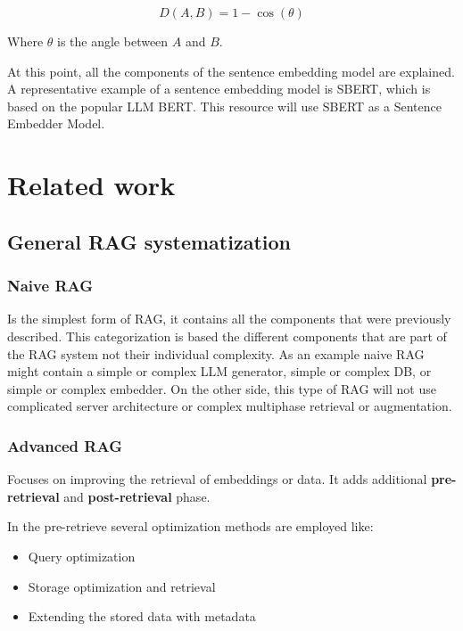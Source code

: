 \documentclass{wseas}
\begin{document}
\begin{equation}
  D(A, B) = 1 - \cos(\theta)
\end{equation}

Where \(\theta\) is the angle between \(A\) and \(B\).

At this point, all the components of the sentence embedding model are
explained. A representative example of a sentence embedding model is
SBERT, which is based on the popular LLM BERT. This resource will use
SBERT as a Sentence Embedder Model.


\section{Related work}

\subsection{General RAG
systematization}

\subsubsection{Naive RAG}

Is the simplest form of RAG, it contains all the components that were 
previously described. This categorization is based the different components 
that are part of the RAG system not their individual complexity. As an example
naive RAG might contain a simple or complex LLM generator, simple or complex DB,
or simple or complex embedder. On the other side, this type of RAG will not 
use complicated server architecture or complex multiphase retrieval or augmentation. 

\subsubsection{Advanced RAG}

Focuses on improving the retrieval of embeddings or data. It adds
additional \textbf{pre-retrieval} and \textbf{post-retrieval} phase. 

In the pre-retrieve several optimization methods are employed like: 
\begin{itemize}
  \item Query optimization 
  \item Storage optimization and retrieval 
  \item Extending the stored data with metadata 
\end{itemize}
  
\end{document}
